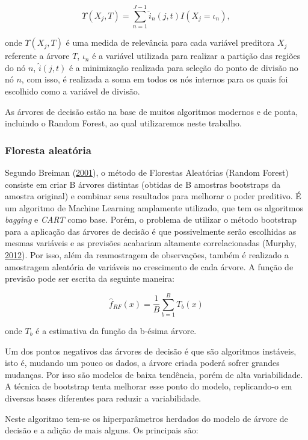 \documentclass[
	12pt,				%
	a4paper,		%
	oneside,    %
	chapter=TITLE,		   %
	section=TITLE,		   %
	subsection=TITLE,	   %
	subsubsection=TITLE, %
	english,			%
	french,				%
	spanish,			%
	brazil,				%
]{abntex2}
\begin{document}
\[
\Upsilon(X_j, T)= \sum_{n=1}^{J-1} \hat{i}_n(j,t) I(X_j=\iota_n),
\]

\noindent onde \(\Upsilon(X_j, T)\) é uma medida de relevância para cada
variável preditora \(X_j\) referente a árvore \(T\), \(\iota_n\) é a
variável utilizada para realizar a partição das regiões do nó \(n\),
\(\hat{i}(j, t)\) é a minimização realizada para seleção do ponto de
divisão no nó \(n\), com isso, é realizada a soma em todos os nós
internos para os quais foi escolhido como a variável de divisão.

As árvores de decisão estão na base de muitos algoritmos modernos e de
ponta, incluindo o Random Forest, ao qual utilizaremos neste trabalho.

\hypertarget{floresta-aleatuxf3ria}{%
\subsubsection{Floresta aleatória}\label{floresta-aleatuxf3ria}}

Segundo Breiman (\protect\hyperlink{ref-breiman2001random}{2001}), o
método de Florestas Aleatórias (Random Forest) consiste em criar B
árvores distintas (obtidas de B amostras bootstraps da amostra original)
e combinar seus resultados para melhorar o poder preditivo. É um
algoritmo de Machine Learning amplamente utilizado, que tem os
algoritmos \emph{bagging} e \emph{CART} como base. Porém, o problema de
utilizar o método bootstrap para a aplicação das árvores de decisão é
que possivelmente serão escolhidas as mesmas variáveis e as previsões
acabariam altamente correlacionadas (Murphy,
\protect\hyperlink{ref-murphy2012probabilistic}{2012}). Por isso, além
da reamostragem de observações, também é realizado a amostragem
aleatória de variáveis no crescimento de cada árvore. A função de
previsão pode ser escrita da seguinte maneira:

\[
\hat{f}_{RF}(x) = \frac{1}{B}\sum_{b=1}^BT_b(x)
\]

\noindent onde \(T_b\) é a estimativa da função da b-ésima árvore.

Um dos pontos negativos das árvores de decisão é que são algoritmos
instáveis, isto é, mudando um pouco os dados, a árvore criada poderá
sofrer grandes mudanças. Por isso são modelos de baixa tendência, porém
de alta variabilidade. A técnica de bootstrap tenta melhorar esse ponto
do modelo, replicando-o em diversas bases diferentes para reduzir a
variabilidade.

Neste algoritmo tem-se os hiperparâmetros herdados do modelo de árvore
de decisão e a adição de mais alguns. Os principais são:
\end{document}

